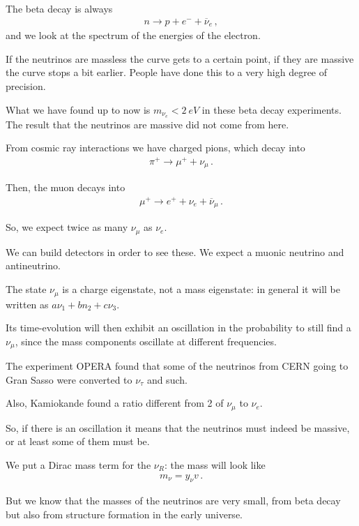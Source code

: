 \documentclass[main.tex]{subfiles}
\begin{document}
The beta decay is always 
%
\begin{align}
n \to p + e^{-} + \overline{\nu}_{e}
\,,
\end{align}
%
and we look at the spectrum of the energies of the electron. 

If the neutrinos are massless the curve gets to a certain point, if they are massive the curve stops a bit earlier. 
People have done this to a very high degree of precision.

What we have found up to now is \(m_{\nu_{e}} < \SI{2}{eV}\) in these beta decay experiments. 
The result that the neutrinos are massive did not come from here. 

From cosmic ray interactions we have charged pions, which decay into 
%
\begin{align}
\pi^{+} \to \mu^+ + \nu_{\mu }
\,.
\end{align}

Then, the muon decays into 
%
\begin{align}
\mu^+ \to e^{+} + \nu_{e} + \overline{\nu}_{\mu }
\,.
\end{align}

So, we expect twice as many \(\nu_{\mu }\) as \(\nu_{e}\).

We can build detectors in order to see these. We expect a muonic neutrino and antineutrino. 

The state \(\nu_{\mu }\) is a charge eigenstate, not a mass eigenstate: in general it will be written as \(a \nu_1 + b n_2 +c \nu_3 \).

Its time-evolution will then exhibit an oscillation in the probability to still find a \(\nu_{\mu }\), since the mass components oscillate at different frequencies.

The experiment OPERA found that some of the neutrinos from CERN going to Gran Sasso were converted to \(\nu_{\tau }\) and such. 

Also, Kamiokande found a ratio different from 2 of \(\nu_{\mu }\) to \(\nu_{e}\).

So, if there is an oscillation it means that the neutrinos must indeed be massive, or at least some of them must be.

We put a Dirac mass term for the \(\nu_{R}\): the mass will look like 
%
\begin{align}
m_{\nu } =  y_{\nu } v
\,.
\end{align}

But we know that the masses of the neutrinos are very small, from beta decay but also from structure formation in the early universe.
\end{document}
